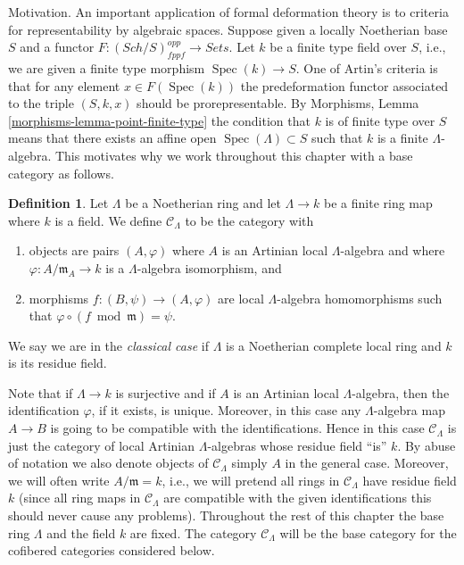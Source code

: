 \documentclass{stacks-project}
\theoremstyle{plain}
\theoremstyle{definition}
\newtheorem{definition}[subsection]{Definition}
\theoremstyle{remark}
\numberwithin{equation}{subsection}
\def\Spec{\mathop{\mathrm{Spec}}}
\def\Sch{\mathit{Sch}}
\begin{document}
\noindent
Motivation. An important application of formal deformation theory is
to criteria for representability by algebraic spaces. Suppose given a
locally Noetherian base $S$ and a functor
$F : (\Sch/S)_{fppf}^{opp} \to \textit{Sets}$.
Let $k$ be a finite type field over $S$, i.e., we are given a
finite type morphism $\Spec(k) \to S$.
One of Artin's criteria is that for any element $x \in F(\Spec(k))$
the predeformation functor associated to
the triple $(S, k, x)$ should be prorepresentable. By
Morphisms, Lemma \ref{morphisms-lemma-point-finite-type}
the condition that $k$ is of finite type over $S$ means that there exists
an affine open $\Spec(\Lambda) \subset S$ such that $k$
is a finite $\Lambda$-algebra. This motivates why we work throughout
this chapter with a base category as follows.

\begin{definition}
\label{definition-CLambda}
Let $\Lambda$ be a Noetherian ring and let $\Lambda \to k$ be a finite
ring map where $k$ is a field. We define {\it $\mathcal{C}_\Lambda$} to be
the category with
\begin{enumerate}
\item objects are pairs $(A, \varphi)$ where $A$ is an Artinian local
$\Lambda$-algebra and where $\varphi : A/\mathfrak m_A \to k$ is a
$\Lambda$-algebra isomorphism, and
\item morphisms $f : (B, \psi) \to (A, \varphi)$ are local $\Lambda$-algebra
homomorphisms such that $\varphi \circ (f \bmod \mathfrak m) = \psi$.
\end{enumerate}
We say we are in the {\it classical case} if $\Lambda$ is a Noetherian
complete local ring and $k$ is its residue field.
\end{definition}

\noindent
Note that if $\Lambda \to k$ is surjective and if $A$ is an Artinian local
$\Lambda$-algebra, then the identification $\varphi$, if it exists,
is unique. Moreover, in this case any $\Lambda$-algebra map $A \to B$ is
going to be compatible with the identifications. Hence in this case
$\mathcal{C}_\Lambda$ is just the category of local Artinian $\Lambda$-algebras
whose residue field ``is'' $k$. By abuse of notation we also denote objects of
$\mathcal{C}_\Lambda$ simply $A$ in the general case. Moreover, we will
often write $A/\mathfrak m = k$, i.e., we will pretend all rings in
$\mathcal{C}_\Lambda$ have residue field $k$ (since all ring maps in
$\mathcal{C}_\Lambda$ are compatible with the given identifications this
should never cause any problems).
Throughout the rest of this chapter the base ring $\Lambda$ and the
field $k$ are fixed. The category $\mathcal{C}_\Lambda$ will be the base
category for the cofibered categories considered below.
\end{document}
